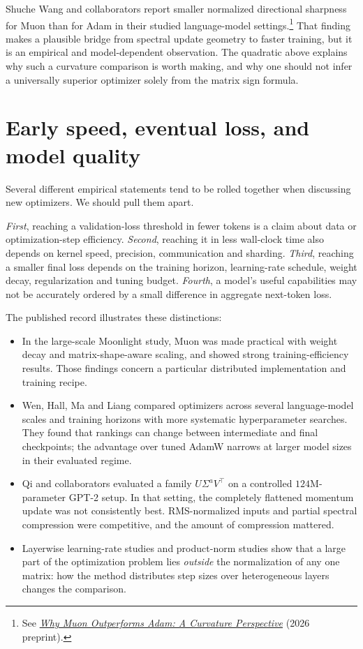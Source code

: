 Shuche Wang and collaborators report smaller normalized directional sharpness for Muon than for Adam in their studied language-model settings.\footnote{See \href{https://arxiv.org/abs/2606.04662}{\emph{Why Muon Outperforms Adam: A Curvature Perspective}} (2026 preprint).}  That finding makes a plausible bridge from spectral update geometry to faster training, but it is an empirical and model-dependent observation.  The quadratic above explains why such a curvature comparison is worth making, and why one should not infer a universally superior optimizer solely from the matrix sign formula.

\section{Early speed, eventual loss, and model quality}

Several different empirical statements tend to be rolled together when discussing new optimizers.  We should pull them apart.

\emph{First}, reaching a validation-loss threshold in fewer tokens is a claim about data or optimization-step efficiency.  \emph{Second}, reaching it in less wall-clock time also depends on kernel speed, precision, communication and sharding.  \emph{Third}, reaching a smaller final loss depends on the training horizon, learning-rate schedule, weight decay, regularization and tuning budget.  \emph{Fourth}, a model's useful capabilities may not be accurately ordered by a small difference in aggregate next-token loss.

The published record illustrates these distinctions:

\begin{itemize}
 \item In the large-scale Moonlight study, Muon was made practical with weight decay and matrix-shape-aware scaling, and showed strong training-efficiency results.  Those findings concern a particular distributed implementation and training recipe.
 \item Wen, Hall, Ma and Liang compared optimizers across several language-model scales and training horizons with more systematic hyperparameter searches.  They found that rankings can change between intermediate and final checkpoints; the advantage over tuned AdamW narrows at larger model sizes in their evaluated regime.
 \item Qi and collaborators evaluated a family \(U\Sigma^aV^\top\) on a controlled \(124\)M-parameter GPT-2 setup.  In that setting, the completely flattened momentum update was not consistently best.  RMS-normalized inputs and partial spectral compression were competitive, and the amount of compression mattered.
 \item Layerwise learning-rate studies and product-norm studies show that a large part of the optimization problem lies \emph{outside} the normalization of any one matrix: how the method distributes step sizes over heterogeneous layers changes the comparison.
\end{itemize}

